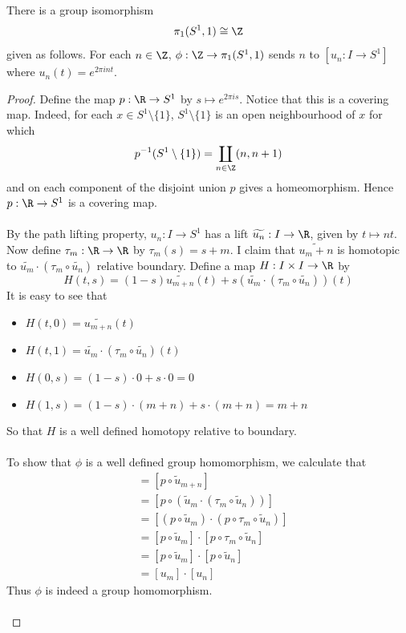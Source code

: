 \documentclass[a4paper]{article}
\begin{document}
\begin{thm}{}{} There is a group isomorphism $$\pi_1(S^1,1)\cong\Z$$ given as follows. For each $n\in\Z$, $\phi:\Z\to\pi_1(S^1,1)$ sends $n$ to $[u_n:I\to S^1]$ where $u_n(t)=e^{2\pi int}$. \tcbline
\begin{proof}
Define the map $p:\R\to S^1$ by $s\mapsto e^{2\pi is}$. Notice that this is a covering map. Indeed, for each $x\in S^1\setminus\{1\}$, $S^1\setminus\{1\}$ is an open neighbourhood of $x$ for which $$p^{-1}(S^1\setminus\{1\})=\coprod_{n\in\Z}(n,n+1)$$ and on each component of the disjoint union $p$ gives a homeomorphism. Hence $p:\R\to S^1$ is a covering map. \\~\\

By the path lifting property, $u_n:I\to S^1$ has a lift $\widetilde{u_n}:I\to\R$, given by $t\mapsto nt$. Now define $\tau_m:\R\to\R$ by $\tau_m(s)=s+m$. I claim that $\widetilde{u_m+n}$ is homotopic to $\widetilde{u_m}\cdot(\tau_m\circ\widetilde{u_n})$ relative boundary. Define a map $H:I\times I\to\R$ by $$H(t,s)=(1-s)\widetilde{u_{m+n}}(t)+s(\widetilde{u_m}\cdot(\tau_m\circ\widetilde{u_n}))(t)$$ It is easy to see that 
\begin{itemize}
\item $H(t,0)=\widetilde{u_{m+n}}(t)$
\item $H(t,1)=\widetilde{u_m}\cdot(\tau_m\circ\widetilde{u_n})(t)$
\item $H(0,s)=(1-s)\cdot 0+s\cdot 0=0$
\item $H(1,s)=(1-s)\cdot(m+n)+s\cdot(m+n)=m+n$
\end{itemize}
So that $H$ is a well defined homotopy relative to boundary. \\~\\

To show that $\phi$ is a well defined group homomorphism, we calculate that 
\begin{align*}
[u_{m+n}]&=[p\circ\widetilde{u}_{m+n}]\tag{Lift of $u$}\\
&=[p\circ(\widetilde{u}_m\cdot(\tau_m\circ\widetilde{u}_n))]\tag{Homotopies descend}\\
&=[(p\circ\widetilde{u}_m)\cdot(p\circ\tau_m\circ\widetilde{u}_n)]\tag{Paths descend}\\
&=[p\circ\widetilde{u}_m]\cdot[p\circ\tau_m\circ\widetilde{u}_n]\tag{Concatenation is well defined up to homotopy}\\
&=[p\circ\widetilde{u}_m]\cdot[p\circ\widetilde{u}_n]\tag{$p\circ\tau_m=p$}\\
&=[u_m]\cdot[u_n]\tag{Lift of $u$}
\end{align*}
Thus $\phi$ is indeed a group homomorphism. \\~\\


\end{proof}
\end{thm}
\end{document}
